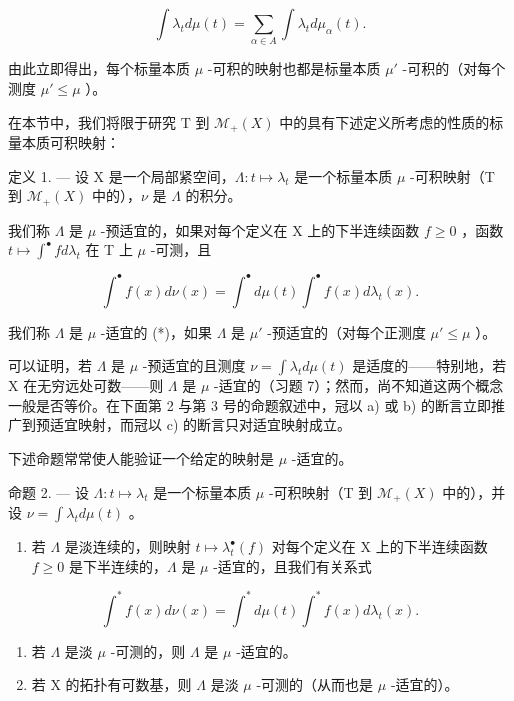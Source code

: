 \[
\int \lambda_ {t} d \mu (t) = \sum_ {\alpha \in A} \int \lambda_ {t} d \mu_ {\alpha} (t).\tag{3}
\]

由此立即得出，每个标量本质 \(\mu\) -可积的映射也都是标量本质 \(\mu'\) -可积的（对每个测度 \(\mu' \leqslant \mu\) ）。

在本节中，我们将限于研究 T 到 \(\mathcal{M}_{+}(X)\) 中的具有下述定义所考虑的性质的标量本质可积映射：

定义 1. --- 设 X 是一个局部紧空间，\(\Lambda : t \mapsto \lambda_t\) 是一个标量本质 \(\mu\) -可积映射（T 到 \(\mathcal{M}_{+}(X)\) 中的），\(\nu\) 是 \(\Lambda\) 的积分。

我们称 \(\Lambda\) 是 \(\mu\) -预适宜的，如果对每个定义在 X 上的下半连续函数 \(f \geqslant 0\) ，函数 \(t \mapsto \int^{\bullet} f d\lambda_t\) 在 T 上 \(\mu\) -可测，且

\[
\int^ {\bullet} f (x) d \nu (x) = \int^ {\bullet} d \mu (t) \int^ {\bullet} f (x) d \lambda_ {t} (x).\tag{4}
\]

我们称 \(\Lambda\) 是 \(\mu\) -适宜的 (*)，如果 \(\Lambda\) 是 \(\mu'\) -预适宜的（对每个正测度 \(\mu' \leqslant \mu\) ）。

可以证明，若 \(\Lambda\) 是 \(\mu\) -预适宜的且测度 \(\nu = \int \lambda_{t} d\mu(t)\) 是适度的——特别地，若 X 在无穷远处可数——则 \(\Lambda\) 是 \(\mu\) -适宜的（习题 7）；然而，尚不知道这两个概念一般是否等价。在下面第 2 与第 3 号的命题叙述中，冠以 a) 或 b) 的断言立即推广到预适宜映射，而冠以 c) 的断言只对适宜映射成立。

下述命题常常使人能验证一个给定的映射是 \(\mu\) -适宜的。

命题 2. --- 设 \(\Lambda : t \mapsto \lambda_t\) 是一个标量本质 \(\mu\) -可积映射（T 到 \(\mathcal{M}_{+}(X)\) 中的），并设 \(\nu = \int \lambda_t d\mu(t)\) 。

\begin{enumerate}
\def\labelenumi{\alph{enumi})}
\tightlist
\item
  若 \(\Lambda\) 是淡连续的，则映射 \(t \mapsto \lambda_t^\bullet(f)\) 对每个定义在 X 上的下半连续函数 \(f \geqslant 0\) 是下半连续的，\(\Lambda\) 是 \(\mu\) -适宜的，且我们有关系式
\end{enumerate}

\[
\int^ {*} f (x) d \nu (x) = \int^ {*} d \mu (t) \int^ {*} f (x) d \lambda_ {t} (x).\tag{5}
\]

\begin{enumerate}
\def\labelenumi{\alph{enumi})}
\setcounter{enumi}{1}
\item
  若 \(\Lambda\) 是淡 \(\mu\) -可测的，则 \(\Lambda\) 是 \(\mu\) -适宜的。
\item
  若 X 的拓扑有可数基，则 \(\Lambda\) 是淡 \(\mu\) -可测的（从而也是 \(\mu\) -适宜的）。
\end{enumerate}

